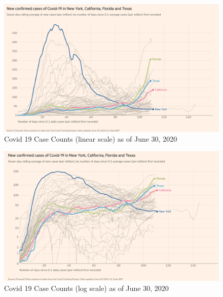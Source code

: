 \documentclass[print]{nuthesis}
\begin{document}
\begin{figure}[tbp]

{\centering \includegraphics[width=0.9\linewidth,]{images/covid19-FT-case-count-06.30.2020-linear} 

}

\caption{Covid 19 Case Counts (linear scale) as of June 30, 2020}\label{fig:covid19-FT-june2020-case-counts-linear}
\end{figure}

\begin{figure}[tbp]

{\centering \includegraphics[width=0.9\linewidth,]{images/covid19-FT-case-count-06.30.2020-log} 

}

\caption{Covid 19 Case Counts (log scale) as of June 30, 2020}\label{fig:covid19-FT-june2020-case-counts-log}
\end{figure}

\end{document}
